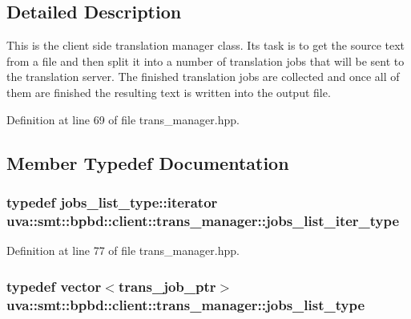 \subsection{Detailed Description}
This is the client side translation manager class. It\textquotesingle{}s task is to get the source text from a file and then split it into a number of translation jobs that will be sent to the translation server. The finished translation jobs are collected and once all of them are finished the resulting text is written into the output file. 

Definition at line 69 of file trans\+\_\+manager.\+hpp.



\subsection{Member Typedef Documentation}
\hypertarget{classuva_1_1smt_1_1bpbd_1_1client_1_1trans__manager_a07f34153efcba519e36ead6bf39c881e}{}
\subsubsection[{jobs\+\_\+list\+\_\+iter\+\_\+type}]{\setlength{\rightskip}{0pt plus 5cm}typedef jobs\+\_\+list\+\_\+type\+::iterator {\bf uva\+::smt\+::bpbd\+::client\+::trans\+\_\+manager\+::jobs\+\_\+list\+\_\+iter\+\_\+type}}\label{classuva_1_1smt_1_1bpbd_1_1client_1_1trans__manager_a07f34153efcba519e36ead6bf39c881e}


Definition at line 77 of file trans\+\_\+manager.\+hpp.

\hypertarget{classuva_1_1smt_1_1bpbd_1_1client_1_1trans__manager_aab9c124d930eca091e5140faa0b306f2}{}
\subsubsection[{jobs\+\_\+list\+\_\+type}]{\setlength{\rightskip}{0pt plus 5cm}typedef vector$<${\bf trans\+\_\+job\+\_\+ptr}$>$ {\bf uva\+::smt\+::bpbd\+::client\+::trans\+\_\+manager\+::jobs\+\_\+list\+\_\+type}}\label{classuva_1_1smt_1_1bpbd_1_1client_1_1trans__manager_aab9c124d930eca091e5140faa0b306f2}


